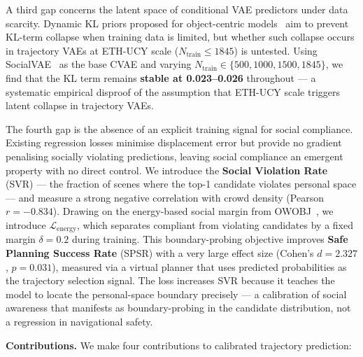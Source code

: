 \documentclass{article}
\begin{document}
A third gap concerns the latent space of conditional VAE predictors under
data scarcity.
Dynamic KL priors proposed for object-centric
models~\cite{zhang2025openworld} aim to prevent KL-term collapse when
training data is limited, but whether such collapse occurs in trajectory
VAEs at ETH-UCY scale ($N_{\mathrm{train}} \leq 1845$) is untested.
Using SocialVAE~\cite{xu2022socialvae} as the base CVAE and varying
$N_{\mathrm{train}} \in \{500, 1000, 1500, 1845\}$, we find that the KL
term remains \textbf{stable at 0.023--0.026} throughout --- a systematic
empirical disproof of the assumption that ETH-UCY scale triggers latent
collapse in trajectory VAEs.

The fourth gap is the absence of an explicit training signal for social
compliance.
Existing regression losses minimise displacement error but provide no
gradient penalising socially violating predictions, leaving social
compliance an emergent property with no direct control.
We introduce the \textbf{Social Violation Rate} (SVR) --- the fraction of
scenes where the top-1 candidate violates personal space --- and measure a
strong negative correlation with crowd density (Pearson $r = -0.834$).
Drawing on the energy-based social margin from
OWOBJ~\cite{zhang2025openworld}, we introduce
$\mathcal{L}_{\mathrm{energy}}$, which separates compliant from violating
candidates by a fixed margin $\delta{=}0.2$ during training.
This boundary-probing objective improves \textbf{Safe Planning Success
Rate} (SPSR) with a very large effect size (Cohen's $d = 2.327$,
$p = 0.031$), measured via a virtual planner that uses predicted
probabilities as the trajectory selection signal.
The loss increases SVR because it teaches the model to locate the
personal-space boundary precisely --- a calibration of social awareness
that manifests as boundary-probing in the candidate distribution, not a
regression in navigational safety.

\noindent\textbf{Contributions.}
We make four contributions to calibrated trajectory prediction:
\end{document}
